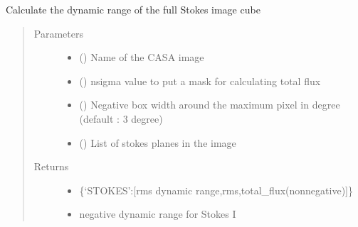 \documentclass[letterpaper,10pt,english]{sphinxmanual}
\begin{document}
\begin{fulllineitems}
\begin{fulllineitems}
\label{\detokenize{paircars:paircars.fullpol_selfcal_LTS.PolSelfcal.calc_dyn_range}}
\sphinxAtStartPar
Calculate the dynamic range of the full Stokes image cube
\begin{quote}\begin{description}
\item[{Parameters}] \leavevmode\begin{itemize}
\item {} 
\sphinxAtStartPar
{} () \textendash{} Name of the CASA image

\item {} 
\sphinxAtStartPar
{} () \textendash{} nsigma value to put a mask for calculating total flux

\item {} 
\sphinxAtStartPar
{} () \textendash{} Negative box width around the maximum pixel in degree (default : 3 degree)

\item {} 
\sphinxAtStartPar
{} () \textendash{} List of stokes planes in the image

\end{itemize}

\item[{Returns}] \leavevmode
\sphinxAtStartPar
\begin{itemize}
\item {} 
\sphinxAtStartPar
{} \textendash{} \{‘STOKES’:{[}rms dynamic range,rms,total\_flux(non\sphinxhyphen{}negative){]}\}

\item {} 
\sphinxAtStartPar
{} \textendash{} negative dynamic range for Stokes I

\end{itemize}



\end{description}
\end{quote}
\end{fulllineitems}
\end{fulllineitems}
\end{document}
